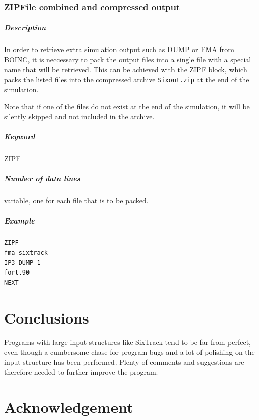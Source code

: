 \documentclass[a4paper,11pt]{report}
\begin{document}
\subsection{ZIPFile combined and compressed output}
\label{sec:ZIPF}

\paragraph{Description}
In order to retrieve extra simulation output such as DUMP or FMA from BOINC, it is neccessary to pack the output files into a single file with a special name that will be retrieved.
This can be achieved with the ZIPF block, which packs the listed files into the compressed archive \texttt{Sixout.zip} at the end of the simulation.

Note that if one of the files do not exist at the end of the simulation, it will be silently skipped and not included in the archive.

\paragraph{Keyword}
ZIPF

\paragraph{Number of data lines}
variable, one for each file that is to be packed.

\paragraph{Example}
\begin{verbatim}
ZIPF
fma_sixtrack
IP3_DUMP_1
fort.90
NEXT
\end{verbatim}

\chapter*{Conclusions}

Programs with large input structures like SixTrack tend to be far from
perfect, even though a cumbersome chase for program bugs and a lot of
polishing on the input structure has been performed.  Plenty of
comments and suggestions are therefore needed to further improve the
program.

\chapter{Acknowledgement}
\end{document}

